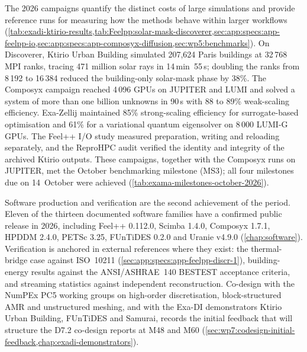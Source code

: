 The 2026 campaigns quantify the distinct costs of large simulations
and provide reference runs for measuring how the methods behave
within larger workflows
(\cref{tab:exadi-ktirio-results,tab:Feelpp:solar-mask-discoverer,sec:app:specs:app-feelpp-io,sec:app:specs:app-composyx-diffusion,sec:wp5:benchmarks}).
On Discoverer, Ktirio Urban Building simulated 207,624 Paris
buildings at 32\,768 MPI ranks, tracing 471 million solar rays in
14\,min~55\,s; doubling the ranks from 8\,192 to 16\,384 reduced the
building-only solar-mask phase by 38\%. The Composyx campaign
reached 4\,096 GPUs on JUPITER and LUMI and solved a system of more
than one billion unknowns in 90\,s with 88 to 89\% weak-scaling
efficiency. Exa-Zellij maintained 85\% strong-scaling efficiency for
surrogate-based optimisation and 61\% for a variational quantum
eigensolver on 8\,000 LUMI-G GPUs. The Feel++ I/O study measured
preparation, writing and reloading separately, and the ReproHPC audit
verified the identity and integrity of the archived Ktirio outputs.
These campaigns, together with the Composyx runs on JUPITER, met the
October benchmarking milestone (MS3); all four milestones due on
14~October were achieved (\cref{tab:exama-milestones-october-2026}).

Software production and verification are the second achievement of
the period. Eleven of the thirteen documented software families have
a confirmed public release in 2026, including Feel++ 0.112.0,
Scimba 1.4.0, Composyx 1.7.1, HPDDM 2.4.0, PETSc 3.25, FUnTiDES 0.2.0
and Uranie v4.9.0 (\cref{chap:software}). Verification is anchored in
external references where they exist: the thermal-bridge case against
ISO~10211 (\cref{sec:app:specs:app-feelpp-discr-1}), building-energy
results against the ANSI/ASHRAE~140 BESTEST acceptance criteria, and
streaming statistics against independent reconstruction. Co-design
with the NumPEx PC5 working groups on high-order discretisation,
block-structured AMR and unstructured meshing, and with the Exa-DI
demonstrators Ktirio Urban Building, FUnTiDES and Samurai, records
the initial feedback that will structure the D7.2 co-design reports
at M48 and M60
(\cref{sec:wp7:codesign-initial-feedback,chap:exadi-demonstrators}).

